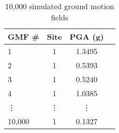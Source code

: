 \begin{table}[htbp]

\centering
\begin{tabular}{ l c c l }

\hline
\rowcolor{anti-flashwhite}
\bf{GMF \#} & \bf{Site} & \bf{PGA (g)}\\
\hline
1 & 1 & 1.3495 \\
2 & 1 & 0.5393 \\
3 & 1 & 0.5240 \\
4 & 1 & 1.0385 \\
\vdots & \vdots & \vdots \\
10,000 & 1 & 0.1327 \\
\hline
\end{tabular}

\caption{10,000 simulated ground motion fields}
\label{tab:gmfs-sim-l1-10000}
\end{table}